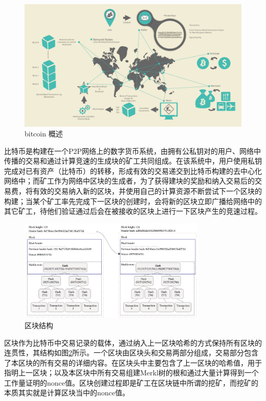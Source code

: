 \begin{figure}[htbp]
 	\centering
 	\includegraphics[width = 1\textwidth]{img/bitcoin}
 	\caption{bitcoin 概述\supercite{antonopoulos2014mastering}}\label{fig:bitcoin}
\end{figure}

比特币是构建在一个P2P网络上的数字货币系统，由拥有公私钥对的用户、网络中传播的交易和通过计算竞速的生成块的矿工共同组成。在该系统中，用户使用私钥完成对已有资产（比特币）的转移，形成有效的交易递交到比特币构建的去中心化网络中；而矿工作为网络中区块的生成者，为了获得建块的奖励和纳入交易后的交易费，将有效的交易纳入新的区块，并使用自己的计算资源不断尝试下一个区块的构建；当某个矿工率先完成下一区块的创建时，会将新的区块立即广播给网络中的其它矿工，待他们验证通过后会在被接收的区块上进行一下区块产生的竞速过程。




\begin{figure}[!htbp]
 	\centering
 	\includegraphics[width = 0.8\textwidth]{img/block_structure}
 	\caption{区块结构}\label{fig:block_structure}
\end{figure}

区块作为比特币中交易记录的载体，通过纳入上一区块哈希的方式保持所有区块的连贯性，其结构如图\ref{fig:block_structure}所示。一个区块由区块头和交易两部分组成，交易部分包含了本区块的所有交易的详细内容。在区块头中主要包含了上一区块的哈希值，用于指明上一区块；以及本区块中所有交易组建Merkl树的根和通过大量计算得到一个工作量证明的nonce值。区块创建过程即是矿工在区块链中所谓的挖矿，而挖矿的本质其实就是计算区块当中的nonce值。





